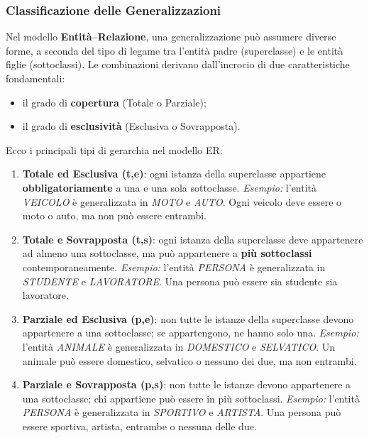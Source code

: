 \subsubsection{Classificazione delle Generalizzazioni}
Nel modello \textbf{Entità–Relazione}, una generalizzazione può assumere diverse forme, a seconda del tipo di legame tra l’entità padre (superclasse) e le entità figlie (sottoclassi).  
Le combinazioni derivano dall’incrocio di due caratteristiche fondamentali:  
\begin{itemize}
    \item il grado di \textbf{copertura} (Totale o Parziale);  
    \item il grado di \textbf{esclusività} (Esclusiva o Sovrapposta).  
\end{itemize}

\noindent
Ecco i principali tipi di gerarchia nel modello ER:

\begin{enumerate}
    \item \textbf{Totale ed Esclusiva (t,e)}:  
    ogni istanza della superclasse appartiene \textbf{obbligatoriamente} a una e una sola sottoclasse.  
    \emph{Esempio:} l’entità \emph{VEICOLO} è generalizzata in \emph{MOTO} e \emph{AUTO}.  
    Ogni veicolo deve essere o moto o auto, ma non può essere entrambi.

    \item \textbf{Totale e Sovrapposta (t,s)}:  
    ogni istanza della superclasse deve appartenere ad almeno una sottoclasse, ma può appartenere a \textbf{più sottoclassi} contemporaneamente.  
    \emph{Esempio:} l’entità \emph{PERSONA} è generalizzata in \emph{STUDENTE} e \emph{LAVORATORE}.  
    Una persona può essere sia studente sia lavoratore.

    \item \textbf{Parziale ed Esclusiva (p,e)}:  
    non tutte le istanze della superclasse devono appartenere a una sottoclasse; se appartengono, ne hanno solo una.  
    \emph{Esempio:} l’entità \emph{ANIMALE} è generalizzata in \emph{DOMESTICO} e \emph{SELVATICO}.  
    Un animale può essere domestico, selvatico o nessuno dei due, ma non entrambi.

    \item \textbf{Parziale e Sovrapposta (p,s)}:  
    non tutte le istanze devono appartenere a una sottoclasse; chi appartiene può essere in più sottoclassi.  
    \emph{Esempio:} l’entità \emph{PERSONA} è generalizzata in \emph{SPORTIVO} e \emph{ARTISTA}.  
    Una persona può essere sportiva, artista, entrambe o nessuna delle due.
\end{enumerate}

